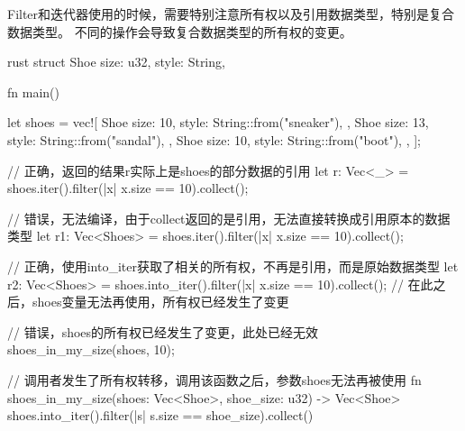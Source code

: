 Filter和迭代器使用的时候，需要特别注意所有权以及引用数据类型，特别是复合数据类型。
不同的操作会导致复合数据类型的所有权的变更。
\begin{code-block}{rust}
struct Shoe {
    size: u32,
    style: String,
}

fn main() {
    let shoes = vec![
        Shoe {
            size: 10,
            style: String::from("sneaker"),
        },
        Shoe {
            size: 13,
            style: String::from("sandal"),
        },
        Shoe {
            size: 10,
            style: String::from("boot"),
        },
    ];

    // 正确，返回的结果r实际上是shoes的部分数据的引用
    let r: Vec<_> = shoes.iter().filter(|x| x.size == 10).collect();

    // 错误，无法编译，由于collect返回的是引用，无法直接转换成引用原本的数据类型
    let r1: Vec<Shoes> = shoes.iter().filter(|x| x.size == 10).collect();

    // 正确，使用into_iter获取了相关的所有权，不再是引用，而是原始数据类型
    let r2: Vec<Shoes> = shoes.into_iter().filter(|x| x.size == 10).collect();
    // 在此之后，shoes变量无法再使用，所有权已经发生了变更

    // 错误，shoes的所有权已经发生了变更，此处已经无效
    shoes_in_my_size(shoes, 10);
}

// 调用者发生了所有权转移，调用该函数之后，参数shoes无法再被使用
fn shoes_in_my_size(shoes: Vec<Shoe>, shoe_size: u32) -> Vec<Shoe> {
    shoes.into_iter().filter(|s| s.size == shoe_size).collect()
}
\end{code-block}

